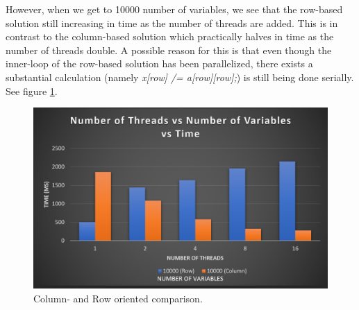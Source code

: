     However, when we get to 10000 number of variables, we see that the row-based solution still increasing in time as the number of threads are added.
    This is in contrast to the column-based solution which practically halves in time as the number of threads double.
    A possible reason for this is that even though the inner-loop of the row-based solution has been parallelized, there exists a substantial calculation (namely \textit{x[row] /= a[row][row];})
    is still being done serially. See figure \ref{fig:rowcol}.
    \begin{figure}
      \centering
      \includegraphics[width=\linewidth]{Figures/rowcol.png}
      \caption{Column- and Row oriented comparison.}
      \label{fig:rowcol}
    \end{figure}

